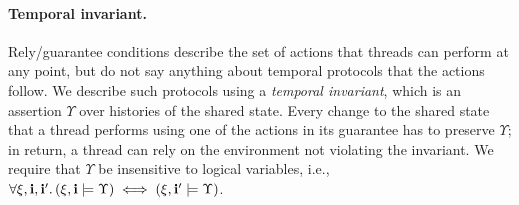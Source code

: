 




\paragraph{Temporal invariant.}
Rely/guarantee conditions describe the set of actions that threads can perform
at any point, but do not say anything about temporal protocols that the actions
follow. We describe such protocols using a {\em temporal invariant}, which is an
assertion $\Upsilon$ over histories of the shared state. %
Every change to the shared state that a thread performs using
one of the actions in its guarantee has to preserve $\Upsilon$; in return, a
thread can rely on the environment not violating the invariant.  
We require that $\Upsilon$ be insensitive to logical variables, i.e., $\forall
\xi, {\bf i}, {\bf i}'.\, (\xi,{\bf i} \models \Upsilon) \iff (\xi,{\bf i}' \models
\Upsilon)$.



